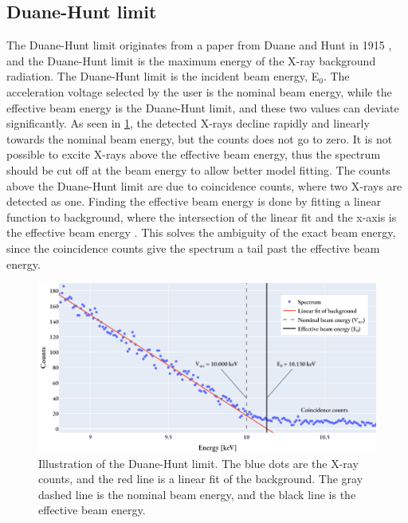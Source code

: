 


\subsection{Duane-Hunt limit}
\label{theory:detector_status:duanehunt}

The Duane-Hunt limit originates from a paper from Duane and Hunt in 1915 \cite{Duane_Hunt_1915}, and the Duane-Hunt limit is the maximum energy of the X-ray background radiation.
The Duane-Hunt limit is the incident beam energy, E$_0$. 
The acceleration voltage selected by the user is the nominal beam energy, while the effective beam energy is the Duane-Hunt limit, and these two values can deviate significantly.
As seen in \cref{fig:duanehunt}, the detected X-rays decline rapidly and linearly towards the nominal beam energy, but the counts does not go to zero.
It is not possible to excite X-rays above the effective beam energy, thus the spectrum should be cut off at the beam energy to allow better model fitting.
The counts above the Duane-Hunt limit are due to coincidence counts, where two X-rays are detected as one.
Finding the effective beam energy is done by fitting a linear function to background, where the intersection of the linear fit and the x-axis is the effective beam energy \cite{software_dtsaii} \cite[Ch. 9.1.3]{goldstein_scanning_2018}.
This solves the ambiguity of the exact beam energy, since the coincidence counts give the spectrum a tail past the effective beam energy.

\begin{figure}[ht]
    \centering
    \includegraphics[width=0.8\linewidth]{figures/Duane-Hunt.png}
    \caption{
        Illustration of the Duane-Hunt limit.
        The blue dots are the X-ray counts, and the red line is a linear fit of the background.
        The gray dashed line is the nominal beam energy, and the black line is the effective beam energy.
    }
    \label{fig:duanehunt}
\end{figure}

